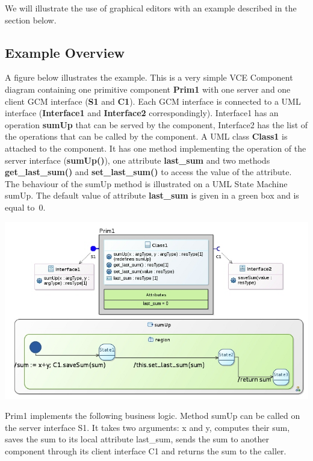 \documentclass[12pt]{article}
\begin{document}
We will illustrate the use of graphical editors with an example described in the section below.

\subsection{Example Overview}

A figure below illustrates the example. This is a very simple VCE Component diagram containing one primitive component \textbf{Prim1} with one server and one client GCM interface (\textbf{S1} and \textbf{C1}). Each GCM interface is connected to a UML interface (\textbf{Interface1} and \textbf{Interface2} correspondingly). Interface1 has an operation \textbf{sumUp} that can be served by the component, Interface2 has the list of the operations that can be called by the component. A UML class \textbf{Class1} is attached to the component. It has one method implementing the operation of the server interface (\textbf{sumUp()}), one attribute \textbf{last\_sum} and two methods \textbf{get\_last\_sum()} and \textbf{set\_last\_sum()} to access the value of the attribute. The behaviour of the sumUp  method is illustrated on a UML State Machine sumUp. The default value of attribute \textbf{last\_sum} is given in a green box and is equal to~0.

     \centerline{
     \includegraphics[width=14cm]{draws/example-full.jpg}
     \label{fig:example-full}
     }

Prim1 implements the following business logic. Method sumUp can be called on the server interface S1. It takes two arguments: x and y, computes their sum, saves the sum to its local attribute last\_sum, sends the sum to another component through its client interface C1 and returns the sum to the caller. 
\end{document}
